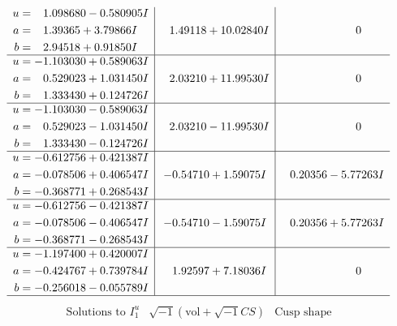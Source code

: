 \documentclass[1p]{elsarticle_modified}
\theoremstyle{definition}
\newcommand{\I}{\sqrt{-1}}
\begin{document}
$$\begin{array}{c|c|c}
\begin{aligned}
u &= \phantom{-}1.098680 - 0.580905 I \\
a &= \phantom{-}1.39365 + 3.79866 I \\
b &= \phantom{-}2.94518 + 0.91850 I\end{aligned}
 & \phantom{-}1.49118 + 10.02840 I & \phantom{-0.000000 } 0 \\ \hline\begin{aligned}
u &= -1.103030 + 0.589063 I \\
a &= \phantom{-}0.529023 + 1.031450 I \\
b &= \phantom{-}1.333430 + 0.124726 I\end{aligned}
 & \phantom{-}2.03210 + 11.99530 I & \phantom{-0.000000 } 0 \\ \hline\begin{aligned}
u &= -1.103030 - 0.589063 I \\
a &= \phantom{-}0.529023 - 1.031450 I \\
b &= \phantom{-}1.333430 - 0.124726 I\end{aligned}
 & \phantom{-}2.03210 - 11.99530 I & \phantom{-0.000000 } 0 \\ \hline\begin{aligned}
u &= -0.612756 + 0.421387 I \\
a &= -0.078506 + 0.406547 I \\
b &= -0.368771 + 0.268543 I\end{aligned}
 & -0.54710 + 1.59075 I & \phantom{-}0.20356 - 5.77263 I \\ \hline\begin{aligned}
u &= -0.612756 - 0.421387 I \\
a &= -0.078506 - 0.406547 I \\
b &= -0.368771 - 0.268543 I\end{aligned}
 & -0.54710 - 1.59075 I & \phantom{-}0.20356 + 5.77263 I \\ \hline\begin{aligned}
u &= -1.197400 + 0.420007 I \\
a &= -0.424767 + 0.739784 I \\
b &= -0.256018 - 0.055789 I\end{aligned}
 & \phantom{-}1.92597 + 7.18036 I & \phantom{-0.000000 } 0\\
 \hline 
 \end{array}$$\newpage$$\begin{array}{c|c|c}  
\text{Solutions to }I^u_{1}& \I (\text{vol} + \sqrt{-1}CS) & \text{Cusp shape}\\
 \hline 
\begin{aligned}

\end{aligned}
\end{array}$$
\end{document}
